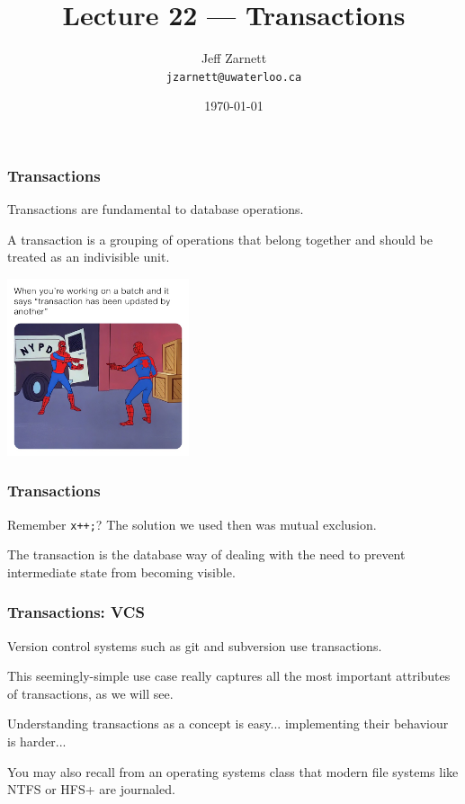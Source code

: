 

\title{Lecture 22 --- Transactions }

\author{Jeff Zarnett \\ \small \texttt{jzarnett@uwaterloo.ca}}
\date{\today}




\begin{frame}
  \titlepage

 \end{frame}


\begin{frame}
\frametitle{Transactions}

Transactions are fundamental to database operations. 

A transaction is a grouping of operations that belong together and should be treated as an indivisible unit. 

\begin{center}
	\includegraphics[width=0.4\textwidth]{images/transactions.jpg}
\end{center}

 \end{frame}


\begin{frame}
\frametitle{Transactions}


Remember \texttt{x++;}? The solution we used then was mutual exclusion.

The transaction is the database way of dealing with the need to prevent intermediate state from becoming visible.


\end{frame}

\begin{frame}
\frametitle{Transactions: VCS}

Version control systems such as git and subversion use transactions. 

This seemingly-simple use case really captures all the most important attributes of transactions, as we will see. 

Understanding transactions as a concept is easy... implementing their behaviour is harder...

You may also recall from an operating systems class that modern file systems like NTFS or HFS+ are journaled. 

\end{frame}

